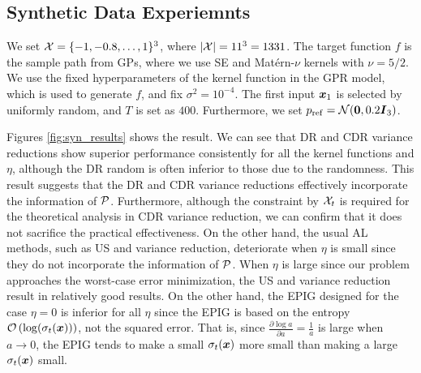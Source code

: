 \subsection{Synthetic Data Experiemnts}

We set ${\cal X}=\{-1, -0.8, \ldots,  1\}^3$, where $|{\cal X}| = 11^3 = 1331$.
%
The target function $f$ is the sample path from GPs, where we use SE and Mat\'ern-$\nu$ kernels with $\nu = 5/2$.
%
We use the fixed hyperparameters of the kernel function in the GPR model, which is used to generate $f$, and fix $\sigma^2 = 10^{-4}$.
%
The first input $\boldsymbol{x}_1$ is selected by uniformly random, and $T$ is set as $400$.
%
Furthermore, we set $p_{\rm ref} = {\cal N}(\boldsymbol{0}, 0.2 \boldsymbol{I}_3)$.



Figures \ref{fig:syn_results} shows the result.
%
We can see that DR and CDR variance reductions show superior performance consistently for all the kernel functions and $\eta$, although the DR random is often inferior to those due to the randomness.
%
This result suggests that the DR and CDR variance reductions effectively incorporate the information of ${\cal P}$.
%
Furthermore, although the constraint by ${\cal X}_t$ is required for the theoretical analysis in CDR variance reduction, we can confirm that it does not sacrifice the practical effectiveness.
%
On the other hand, the usual AL methods, such as US and variance reduction, deteriorate when $\eta$ is small since they do not incorporate the information of ${\cal P}$.
%
When $\eta$ is large since our problem approaches the worst-case error minimization, the US and variance reduction result in relatively good results.
%
On the other hand, the EPIG designed for the case $\eta = 0$ is inferior for all $\eta$ since the EPIG is based on the entropy ${\cal O}\left(\log (\sigma_t(\boldsymbol{x}))\right)$, not the squared error.
%
That is, since $\frac{\partial \log a}{\partial a} = \frac{1}{a}$ is large when $a \rightarrow 0$, the EPIG tends to make a small $\sigma_t(\boldsymbol{x})$ more small than making a large $\sigma_t(\boldsymbol{x})$ small.


